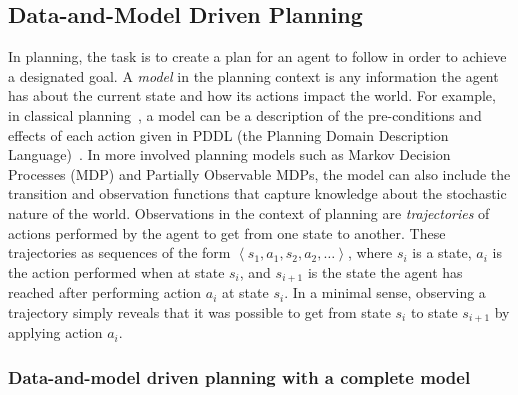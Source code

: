 \documentclass[12pt]{article}
\newcommand{\tuple}[1]{\ensuremath{\left \langle #1 \right \rangle }}
\begin{document}
\subsection{Data-and-Model Driven Planning}

In planning, the task is to create a plan for an agent to follow in order to achieve a designated goal. A {\em model} in the planning context is any information the agent has about the current state and how its actions impact the world. For example, in classical planning~\cite{fikes1971strips}, a model can be a description of the pre-conditions and effects of each action given in PDDL (the Planning Domain Description Language)~\cite{mcdermott1998pddl}. In more involved planning models such as Markov Decision Processes (MDP) and Partially Observable MDPs, the model can also include the transition and observation functions that capture knowledge about the stochastic nature of the world. 
Observations in the context of planning are {\em trajectories} of actions performed by the agent to get from one state to another. These trajectories as sequences of the form $\tuple{ s_1, a_1, s_2, a_2, \ldots}$, where $s_i$ is a state, $a_i$ is the action performed when at state $s_i$, and $s_{i+1}$ is the state the agent has reached after performing action $a_i$ at state $s_i$. In a minimal sense, observing a trajectory simply reveals that it was possible to get from state $s_i$ to state $s_{i+1}$ by applying action $a_i$. %


\subsubsection{Data-and-model driven planning with a complete model}
\end{document}
